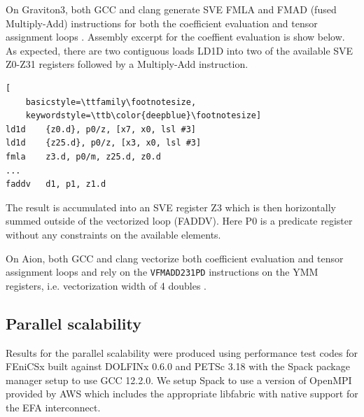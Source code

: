 On Graviton3, both GCC and clang generate SVE FMLA and FMAD (fused
Multiply-Add) instructions \citep{ArmReferenceManual} for both the
coefficient evaluation and tensor assignment loops
\citep{GodboltArmClang,GodboltArmGCC}. Assembly excerpt for the coeffient
evaluation is show below. As expected, there are two contiguous loads LD1D
into two of the available SVE Z0-Z31 registers followed by a Multiply-Add
instruction.
\begin{lstlisting}[
    basicstyle=\ttfamily\footnotesize,
    keywordstyle=\ttb\color{deepblue}\footnotesize]
ld1d    {z0.d}, p0/z, [x7, x0, lsl #3]
ld1d    {z25.d}, p0/z, [x3, x0, lsl #3]
fmla    z3.d, p0/m, z25.d, z0.d
...
faddv   d1, p1, z1.d
\end{lstlisting}
The result is accumulated into an SVE register Z3 which is then horizontally
summed outside of the vectorized loop (FADDV). Here P0 is a predicate
register without any constraints on the available elements.

On Aion, both GCC and clang vectorize both coefficient evaluation and tensor
assignment loops and rely on the \lstinline{VFMADD231PD} instructions on the
YMM registers, i.e. vectorization width of 4 doubles
\citep{Godboltx86Clang,Godboltx86GCC}.


\subsection*{Parallel scalability}

Results for the parallel scalability were produced using performance test codes
for FEniCSx \citep{Wells2023} built against DOLFINx 0.6.0 and PETSc 3.18
\citep{petsc} with the Spack package manager setup to use GCC 12.2.0. We setup
Spack to use a version of OpenMPI provided by AWS which includes the
appropriate libfabric with native support for the EFA interconnect.

